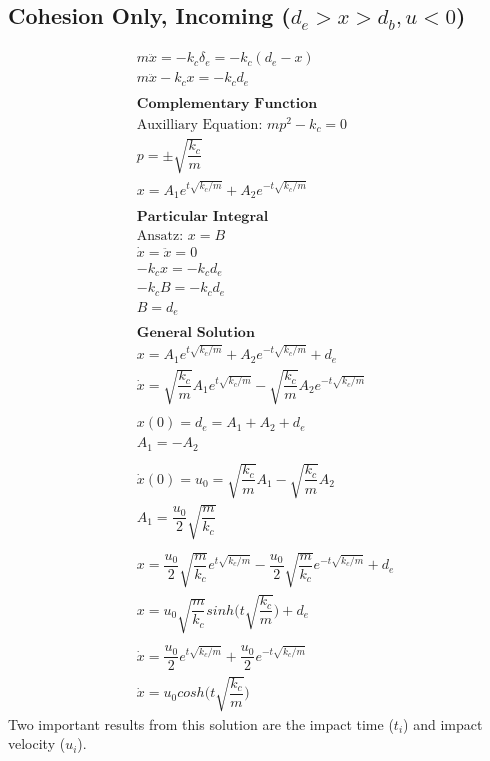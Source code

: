 \documentclass[a4paper,11pt,titlepage]{report}
\begin{document}
\subsection{Cohesion Only, Incoming ($d_e > x > d_b, u < 0$)}
\label{sec:cohesion only incoming}
\begin{align*}
&m \ddot{x} = - k_c \delta_e = - k_c (d_e - x) \\
&m \ddot{x} - k_c x = - k_c d_e \\\\
&\textbf{Complementary Function} \\
&\text{Auxilliary Equation: } mp^2 - k_c = 0 \\
&p = \pm \sqrt{\dfrac{k_c}{m}} \\ 
&x = A_1 e^{t \sqrt{k_c / m}} + A_2 e^{- t \sqrt{k_c / m}} \\\\
&\textbf{Particular Integral} \\
&\text{Ansatz: } x = B \\
&\dot{x} = \ddot{x} = 0 \\
&- k_c x = - k_c d_e  \\
&- k_c B = - k_c d_e \\
& B = d_e \\\\
&\textbf{General Solution} \\
&x = A_1 e^{t \sqrt{k_c / m}} + A_2 e^{- t \sqrt{k_c / m}} + d_e \\
&\dot{x} = \sqrt{\dfrac{k_c}{m}} A_1 e^{t \sqrt{k_c / m}} - \sqrt{\dfrac{k_c}{m}} A_2 e^{- t \sqrt{k_c / m}} \\\\
&x(0) = d_e = A_1 + A_2 + d_e \\
&A_1 = - A_2 \\\\
&\dot{x}(0) = u_0 = \sqrt{\dfrac{k_c}{m}} A_1 - \sqrt{\dfrac{k_c}{m}} A_2 \\
&A_1 = \dfrac{u_0}{2} \sqrt{\dfrac{m}{k_c}} \\\\
&x = \dfrac{u_0}{2} \sqrt{\dfrac{m}{k_c}} e^{t \sqrt{k_c / m}} - \dfrac{u_0}{2} \sqrt{\dfrac{m}{k_c}} e^{- t \sqrt{k_c / m}} + d_e \\
&x = u_0 \sqrt{\dfrac{m}{k_c}} sinh\Big(t\sqrt{\dfrac{k_c}{m}}\Big) + d_e \\\\
&\dot{x} = \dfrac{u_0}{2} e^{t \sqrt{k_c / m}} + \dfrac{u_0}{2} e^{- t \sqrt{k_c / m}} \\
&\dot{x} = u_0 cosh\Big(t\sqrt{\dfrac{k_c}{m}}\Big)
\end{align*}
Two important results from this solution are the impact time ($t_i$) and impact velocity ($u_i$).
\end{document}
